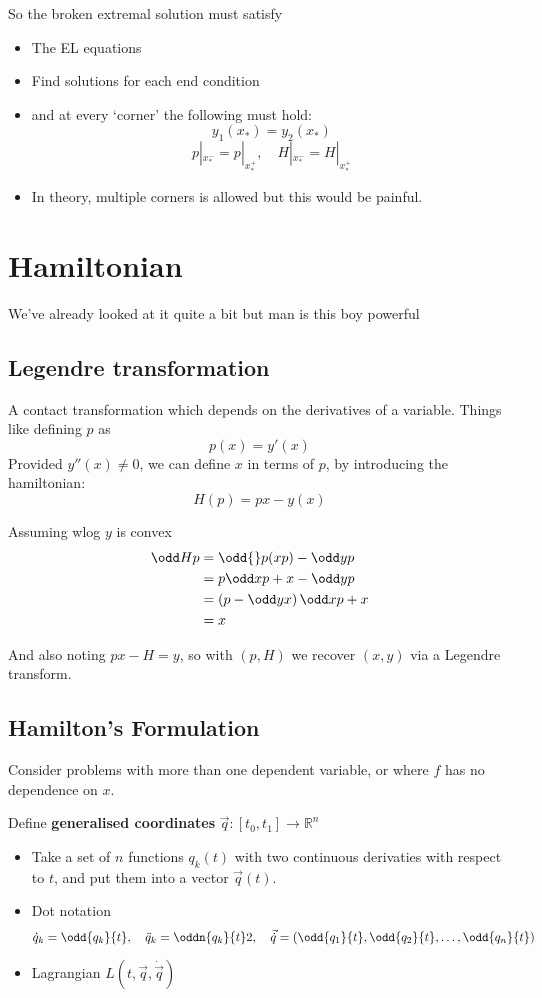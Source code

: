 \documentclass{E:/Documents/Latex/myassignment}
\begin{document}
So the broken extremal solution must satisfy
\begin{itemize}
	\item The EL equations
	\item Find solutions for each end condition
	\item and at every `corner' the following must hold:
	\[y_1(x_*) = y_2(x_*)\]
	\[p|_{x_*^-} = p|_{x_*^+}, \quad H|_{x_*^-} = H|_{x_*^+}\]
	\item In theory, multiple corners is allowed but this would be painful.
\end{itemize}






\section{Hamiltonian}
We've already looked at it quite a bit but man is this boy powerful

\subsection{Legendre transformation}
A contact transformation which depends on the derivatives of a variable. Things like defining $p$ as
\[p(x) = y'(x)\]
Provided $y''(x) \neq 0$, we can define $x$ in terms of $p$, by introducing the hamiltonian:
\[H(p) = px - y(x)\]

Assuming wlog $y$ is convex
\begin{align*}
	\odd Hp &= \odd{}p(xp) - \odd yp\\
	&= p \odd xp + x - \odd yp\\
	&= \left(p - \odd yx\right) \odd xp + x\\
	&= x
\end{align*}

And also noting $px - H = y$, so with $(p,H)$ we recover $(x,y)$ via a Legendre transform.



\subsection{Hamilton's Formulation}
Consider problems with more than one dependent variable, or where $f$ has no dependence on $x$.

Define \textbf{generalised coordinates} $\vec q : [t_0, t_1] \to \mathbb{R}^n$
\begin{itemize}
	\item Take a set of $n$ functions $q_k(t)$ with two continuous derivaties with respect to $t$, and put them into a vector $\vec q(t)$.
	\item Dot notation
	\[\dot q_k = \odd {q_k}{t}, \quad \ddot q_k = \oddn{q_k}{t}2, \quad \vec{\dot q} = \left(\odd{q_1}{t}, \odd{q_2}{t}, \hdots, \odd{q_n}{t}\right)\]
	\item Lagrangian $L(t,\vec q, \dot{\vec q})$
\end{itemize}
\end{document}
